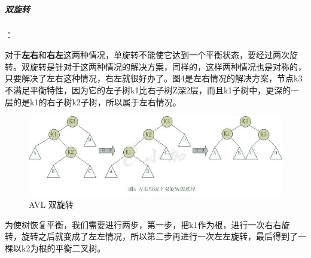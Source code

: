 \documentclass[UTF8,a4paper,12pt]{ctexbook}
\begin{document}
			\subparagraph{双旋转}：
			
				对于\textbf{左右}和\textbf{右左}这两种情况，单旋转不能使它达到一个平衡状态，要经过两次旋转。双旋转是针对于这两种情况的解决方案，同样的，这样两种情况也是对称的，只要解决了左右这种情况，右左就很好办了。图4是左右情况的解决方案，节点k3不满足平衡特性，因为它的左子树k1比右子树Z深2层，而且k1子树中，更深的一层的是k1的右子树k2子树，所以属于左右情况。
				\begin{figure}[h]
					\centering
					\includegraphics[scale = 0.8]{Rotate_2.jpg}
					\caption{AVL 双旋转}
				\end{figure}
				
				为使树恢复平衡，我们需要进行两步，第一步，把k1作为根，进行一次右右旋转，旋转之后就变成了左左情况，所以第二步再进行一次左左旋转，最后得到了一棵以k2为根的平衡二叉树。
			
\end{document}
